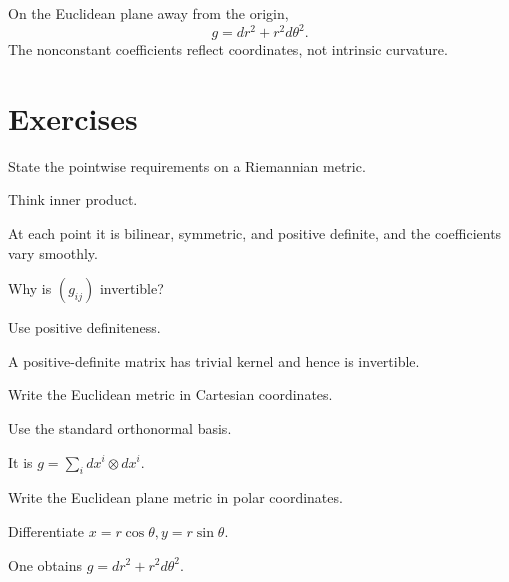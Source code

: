 \begin{example}\label{ex:vii20-polar}
On the Euclidean plane away from the origin,
\[
g=dr^2+r^2d\theta^2.
\]
The nonconstant coefficients reflect coordinates, not intrinsic curvature.
\end{example}

\section{Exercises}

\begin{exercise}\label{exr:vii20-01}
State the pointwise requirements on a Riemannian metric.
\end{exercise}
\begin{hint}
Think inner product.
\end{hint}
\begin{solution}
At each point it is bilinear, symmetric, and positive definite, and the coefficients vary smoothly.
\end{solution}

\begin{exercise}\label{exr:vii20-02}
Why is \((g_{ij})\) invertible?
\end{exercise}
\begin{hint}
Use positive definiteness.
\end{hint}
\begin{solution}
A positive-definite matrix has trivial kernel and hence is invertible.
\end{solution}

\begin{exercise}\label{exr:vii20-03}
Write the Euclidean metric in Cartesian coordinates.
\end{exercise}
\begin{hint}
Use the standard orthonormal basis.
\end{hint}
\begin{solution}
It is \(g=\sum_i dx^i\otimes dx^i\).
\end{solution}

\begin{exercise}\label{exr:vii20-04}
Write the Euclidean plane metric in polar coordinates.
\end{exercise}
\begin{hint}
Differentiate \(x=r\cos\theta,y=r\sin\theta\).
\end{hint}
\begin{solution}
One obtains \(g=dr^2+r^2d\theta^2\).
\end{solution}

